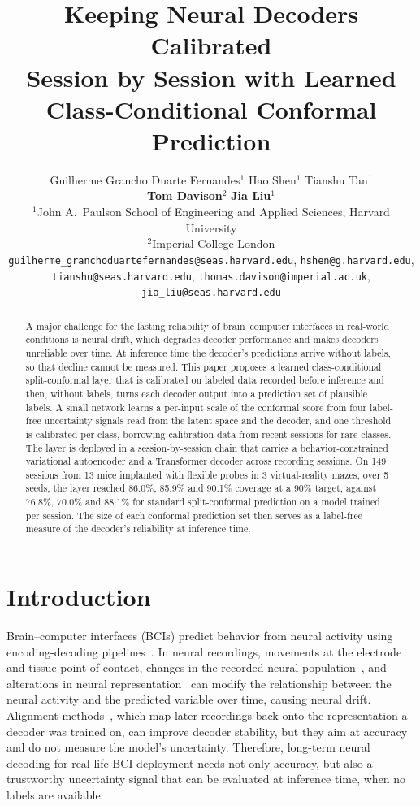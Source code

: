\documentclass{article}
\title{Keeping Neural Decoders Calibrated\\ Session by Session with Learned\\ Class-Conditional Conformal Prediction}
\author{%
  Guilherme Grancho Duarte Fernandes$^{1}$ \quad
  Hao Shen$^{1}$ \quad
  Tianshu Tan$^{1}$ \\
  \textbf{Tom Davison}$^{2}$ \quad
  \textbf{Jia Liu}$^{1}$ \\
  $^{1}$John A.\ Paulson School of Engineering and Applied Sciences, Harvard University \\
  $^{2}$Imperial College London \\
  \texttt{guilherme\_granchoduartefernandes@seas.harvard.edu}, \texttt{hshen@g.harvard.edu}, \\
  \texttt{tianshu@seas.harvard.edu}, \texttt{thomas.davison@imperial.ac.uk}, \\
  \texttt{jia\_liu@seas.harvard.edu} \\
}
\begin{document}
\maketitle

\begin{abstract}
A major challenge for the lasting reliability of brain--computer interfaces in real-world conditions is neural drift, which degrades decoder performance and makes decoders unreliable over time. At inference time the decoder's predictions arrive without labels, so that decline cannot be measured. This paper proposes a learned class-conditional split-conformal layer that is calibrated on labeled data recorded before inference and then, without labels, turns each decoder output into a prediction set of plausible labels. A small network learns a per-input scale of the conformal score from four label-free uncertainty signals read from the latent space and the decoder, and one threshold is calibrated per class, borrowing calibration data from recent sessions for rare classes. The layer is deployed in a session-by-session chain that carries a behavior-constrained variational autoencoder and a Transformer decoder across recording sessions. On 149 sessions from 13 mice implanted with flexible probes in 3 virtual-reality mazes, over 5 seeds, the layer reached 86.0\%, 85.9\% and 90.1\% coverage at a 90\% target, against 76.8\%, 70.0\% and 88.1\% for standard split-conformal prediction on a model trained per session. The size of each conformal prediction set then serves as a label-free measure of the decoder's reliability at inference time.
\end{abstract}

\section{Introduction}
Brain--computer interfaces (BCIs) predict behavior from neural activity using encoding-decoding pipelines~\cite{dong2023a}. In neural recordings, movements at the electrode and tissue point of contact, changes in the recorded neural population~\cite{tang2023a,vanbeest2025}, and alterations in neural representation~\cite{deitch2021,rule2019a} can modify the relationship between the neural activity and the predicted variable over time, causing neural drift. Alignment methods~\cite{karpowicz2025a,degenhart2020a}, which map later recordings back onto the representation a decoder was trained on, can improve decoder stability, but they aim at accuracy and do not measure the model's uncertainty. Therefore, long-term neural decoding for real-life BCI deployment needs not only accuracy, but also a trustworthy uncertainty signal that can be evaluated at inference time, when no labels are available.
\end{document}
